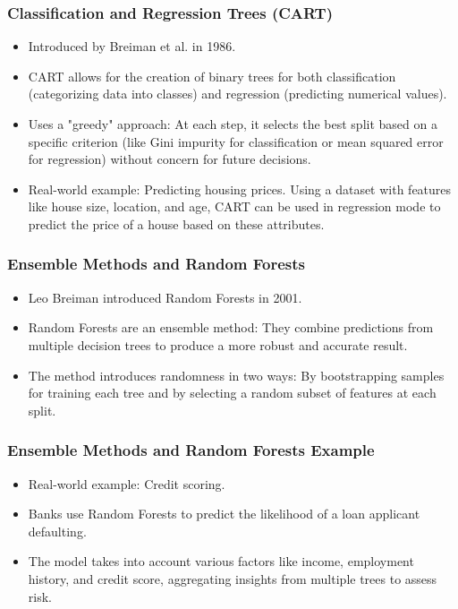 \documentclass{beamer}
\begin{document}
\begin{frame}
\frametitle{Classification and Regression Trees (CART)}
\begin{itemize}
    \item Introduced by Breiman et al. in 1986.
    \item CART allows for the creation of binary trees for both classification (categorizing data into classes) and regression (predicting numerical values).
    \item Uses a "greedy" approach: At each step, it selects the best split based on a specific criterion (like Gini impurity for classification or mean squared error for regression) without concern for future decisions.
    \item Real-world example: Predicting housing prices. Using a dataset with features like house size, location, and age, CART can be used in regression mode to predict the price of a house based on these attributes.
\end{itemize}
\end{frame}

\begin{frame}
\frametitle{Ensemble Methods and Random Forests}
\begin{itemize}
    \item Leo Breiman introduced Random Forests in 2001.
    \item Random Forests are an ensemble method: They combine predictions from multiple decision trees to produce a more robust and accurate result.
    \item The method introduces randomness in two ways: By bootstrapping samples for training each tree and by selecting a random subset of features at each split.
\end{itemize}
\end{frame}


\begin{frame}
\frametitle{Ensemble Methods and Random Forests Example}
\begin{itemize}
    \item Real-world example: Credit scoring.
    \item  Banks use Random Forests to predict the likelihood of a loan applicant defaulting.
    \item The model takes into account various factors like income, employment history, and credit score, aggregating insights from multiple trees to assess risk.
\end{itemize}
\end{frame}
\end{document}
